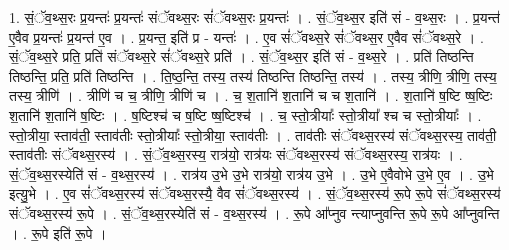 \documentclass[17pt]{extarticle}
\begin{document}
1. सं॒ॅव॒थ्स॒रः प्र॒यन्तः॑ प्र॒यन्तः॑ संॅवथ्स॒रः सं॑ॅवथ्स॒रः प्र॒यन्तः॑ । . सं॒ॅव॒थ्स॒र इति॑ सं - व॒थ्स॒रः । . प्र॒यन्त॑ ए॒वैव प्र॒यन्तः॑ प्र॒यन्त॑ ए॒व । . प्र॒यन्त॒ इति॑ प्र - यन्तः॑ । . ए॒व सं॑ॅवथ्स॒रे सं॑ॅवथ्स॒र ए॒वैव सं॑ॅवथ्स॒रे । . सं॒ॅव॒थ्स॒रे प्रति॒ प्रति॑ संॅवथ्स॒रे सं॑ॅवथ्स॒रे प्रति॑ । . सं॒ॅव॒थ्स॒र इति॑ सं - व॒थ्स॒रे । . प्रति॑ तिष्ठन्ति तिष्ठन्ति॒ प्रति॒ प्रति॑ तिष्ठन्ति । . ति॒ष्ठ॒न्ति॒ तस्य॒ तस्य॑ तिष्ठन्ति तिष्ठन्ति॒ तस्य॑ । . तस्य॒ त्रीणि॒ त्रीणि॒ तस्य॒ तस्य॒ त्रीणि॑ । . त्रीणि॑ च च॒ त्रीणि॒ त्रीणि॑ च । . च॒ श॒तानि॑ श॒तानि॑ च च श॒तानि॑ । . श॒तानि॑ ष॒ष्टि ष्ष॒ष्टिः श॒तानि॑ श॒तानि॑ ष॒ष्टिः । . ष॒ष्टिश्च॑ च ष॒ष्टि ष्ष॒ष्टिश्च॑ । . च॒ स्तो॒त्रीयाः᳚ स्तो॒त्रीया᳚ श्च च स्तो॒त्रीयाः᳚ । . स्तो॒त्रीया॒ स्ताव॑ती॒ स्ताव॑तीः स्तो॒त्रीयाः᳚ स्तो॒त्रीया॒ स्ताव॑तीः । . ताव॑तीः संॅवथ्स॒रस्य॑ संॅवथ्स॒रस्य॒ ताव॑ती॒ स्ताव॑तीः संॅवथ्स॒रस्य॑ । . सं॒ॅव॒थ्स॒रस्य॒ रात्र॑यो॒ रात्र॑यः संॅवथ्स॒रस्य॑ संॅवथ्स॒रस्य॒ रात्र॑यः । . सं॒ॅव॒थ्स॒रस्येति॑ सं - व॒थ्स॒रस्य॑ । . रात्र॑य उ॒भे उ॒भे रात्र॑यो॒ रात्र॑य उ॒भे । . उ॒भे ए॒वैवोभे उ॒भे ए॒व । . उ॒भे इत्यु॒भे । . ए॒व सं॑ॅवथ्स॒रस्य॑ संॅवथ्स॒रस्यै॒ वैव सं॑ॅवथ्स॒रस्य॑ । . सं॒ॅव॒थ्स॒रस्य॑ रू॒पे रू॒पे सं॑ॅवथ्स॒रस्य॑ संॅवथ्स॒रस्य॑ रू॒पे । . सं॒ॅव॒थ्स॒रस्येति॑ सं - व॒थ्स॒रस्य॑ । . रू॒पे आ᳚प्नुव न्त्याप्नुवन्ति रू॒पे रू॒पे आ᳚प्नुवन्ति । . रू॒पे इति॑ रू॒पे । \newline
\end{document}
